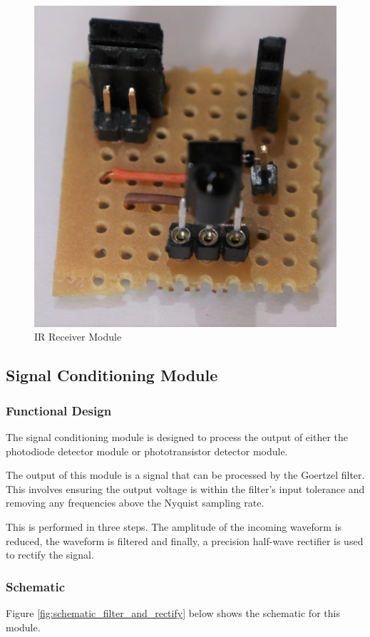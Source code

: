\begin{figure}[H]
	\centering
	\includegraphics[width=.6\textwidth]{figures/modules/ir_receiver.jpg}
	\caption{IR Receiver Module}
	\label{fig:module_ir_receiver}
\end{figure}






\subsection{Signal Conditioning Module}
\label{sec:signal_conditioning_module}

\subsubsection{Functional Design}
The signal conditioning module is designed to process the output of either the photodiode detector module or phototransistor detector module.

The output of this module is a signal that can be processed by the Goertzel filter. This involves ensuring the output voltage is within the filter's input tolerance and removing any frequencies above the Nyquist sampling rate.

This is performed in three steps. The amplitude of the incoming waveform is reduced, the waveform is filtered and finally, a precision half-wave rectifier is used to rectify the signal.

\subsubsection{Schematic}
Figure \ref{fig:schematic_filter_and_rectify} below shows the schematic for this module.

